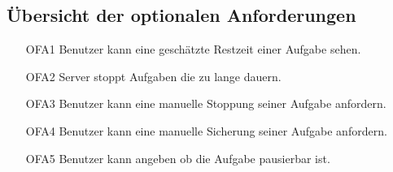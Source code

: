 \documentclass[a4paper,12pt]{article}
\begin{document}
\subsection{Übersicht der optionalen Anforderungen}
\begin{itemize}[nosep]
\leftskip=0.5cm
\item[OFA1] Benutzer kann eine geschätzte Restzeit einer Aufgabe sehen.
\item[OFA2] Server stoppt Aufgaben die zu lange dauern.
\item[OFA3] Benutzer kann eine manuelle Stoppung seiner Aufgabe anfordern.
\item[OFA4] Benutzer kann eine manuelle Sicherung seiner Aufgabe anfordern.
\item[OFA5] Benutzer kann angeben ob die Aufgabe pausierbar ist.
\end{itemize}
\newpage
\end{document}
